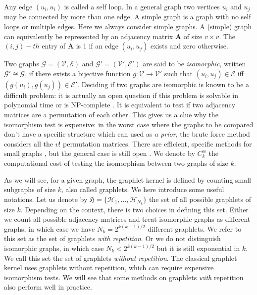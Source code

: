 Any edge $(u_i, u_i)$ is called a self loop. In a general graph two vertices $u_i$ and $u_j$ may be connected by more than
one edge. A simple graph is a graph with no self loops or multiple edges. Here we always consider simple graphs.
A (simple) graph can equivalently be represented by an adjacency matrix $\mathbf{A}$ of size $v \times v$. The $(i,j)-th$ entry of $\mathbf{A}$ is 1 if an edge $(u_i, u_j)$ exists and zero otherwise.

Two graphs $\mathcal{G}=(\mathcal{V},\mathcal{E})$ and $\mathcal{G'}=(\mathcal{V'},\mathcal{E'})$ are said to be \emph{isomorphic}, written $\mathcal{G}'\cong \mathcal{G}$, if there exists a bijective function $g:\mathcal{V}\xrightarrow{} \mathcal{V}'$ such that $(u_i,u_j)\in \mathcal{E}$ iff $(g(u_i),g(u_j))\in \mathcal{E}'$. Deciding if two graphs are isomorphic is known to be a difficult problem: it is actually an open question if this problem is solvable in polynomial time or is NP-complete . It is equivalent to test if two adjacency matrices are a permutation of each other. This gives us a clue why the isomorphism test is expensive: in the worst case where the graphs to be compared don't have a specific structure which can used as \emph{a prior}, the brute force method considers all the $v!$ permutation matrices. There are efficient, specific methods for small graphs \citep{graphlet_kernel}, but the general case is still open . We denote by $C^{\cong}_k$ the computational cost of testing the isomorphism between two graphs of size $k$. 

As we will see, for a given graph, the graphlet kernel is defined by counting small subgraphs of size $k$, also called graphlets. We here introduce some useful notations. Let us denote by $\mathfrak{H}=\{\mathcal{H}_1,..., \mathcal{H}_{N_k}\}$ the set of all possible graphlets of size $k$. Depending on the context, there is two choices in defining this set. Either we count all possible adjacency matrices and treat isomorphic graphs as different graphs, in which case we have $N_k=2^{k(k-1)/2}$ different graphlets. We refer to this set as the set of graphlets \emph{with repetition}. Or we do not distinguish isomorphic graphs, in which case $N_k<2^{k(k-1)/2}$ but it is still exponential in $k$. We call this set the set of graphlets \emph{without repetition}. The classical graphlet kernel uses graphlets without repetition, which can require expensive isomorphism tests. We will see that some methods on graphlets \emph{with} repetition also perform well in practice.

